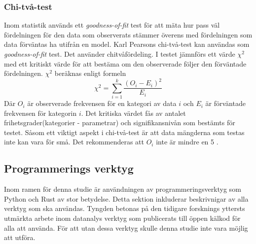 \documentclass[swedish,a4paper]{article}
\begin{document}
\subsubsection{Chi-två-test}
\label{sec:chi_square}
Inom statistik används ett \textit{goodness-of-fit} test för att mäta
hur pass väl fördelningen för den data som observerats stämmer överens
med fördelningen som data förväntas ha utifrån en model. Karl Pearsons
chi-två-test kan användas som \textit{goodness-of-fit} test. Det
använder chitvåfördeling. I testet jämnförs ett värde $\chi^2$ med ett
kritiskt värde för att bestäma om den observerade följer den förväntade
fördelningen. $\chi^2$ beräknas enligt formeln
$$\chi^2 = \sum_{i=1}^k\frac{(O_i - E_i)^2}{E_i}$$
Där $O_i$ är observerade frekvensen för en kategori av data $i$ och $E_i$
är förväntade frekvensen för kategorin $i$.
Det kritiska värdet fås av antalet frihetsgrader(kategorier - parametrar)
och signifikansnivån som bestämts för testet. Såsom ett viktigt aspekt i chi-två-test är att data mängderna som testas inte kan vara för
små. Det rekommenderas att $O_i$ inte är mindre en 5 \parencite{nist}.



\subsection{Programmerings verktyg}
\label{sec:verktyg}
Inom ramen för denna studie är användningen av programmeringsverktyg som Python
och Rust av stor betydelse. Detta sektion inkluderar beskrivnigar av alla
verktyg som ska användas. Tyngden betonas på den tidigare forsknings yttersts
utmärkta arbete inom datanalys verktyg som publicerats till öppen kälkod  för alla att
använda. För att utan dessa verktyg skulle denna studie inte
vara möjlig att utföra. 
\end{document}
